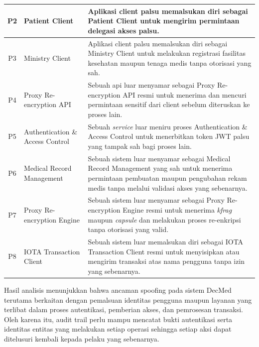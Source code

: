 \begin{xltabular}{\textwidth}{|c|>{\raggedright\arraybackslash}p{3.2cm}|X|}
    P2 &
    Patient Client &
    Aplikasi client palsu memalsukan diri sebagai Patient Client untuk mengirim permintaan delegasi akses palsu. \\
    \hline

    P3 &
    Ministry Client &
    Aplikasi client palsu memalsukan diri sebagai Ministry Client untuk melakukan registrasi fasilitas kesehatan maupun tenaga medis tanpa otorisasi yang sah. \\
    \hline

    P4 &
    Proxy Re-encryption API &
    Sebuah api luar menyamar sebagai Proxy Re-encryption API resmi untuk menerima dan mencuri permintaan sensitif dari client sebelum diteruskan ke proses lain. \\
    \hline

    P5 &
    Authentication \& Access Control &
    Sebuah \textit{service} luar meniru proses Authentication \& Access Control untuk menerbitkan token JWT palsu yang tampak sah bagi proses lain. \\
    \hline

    P6 &
    Medical Record Management &
    Sebuah sistem luar menyamar sebagai Medical Record Management yang sah untuk menerima permintaan pembuatan maupun pengubahan rekam medis tanpa melalui validasi akses yang sebenarnya. \\
    \hline

    P7 &
    Proxy Re-encryption Engine &
    Sebuah sistem luar menyamar sebagai Proxy Re-encryption Engine resmi untuk menerima \textit{kfrag} maupun \textit{capsule} dan melakukan proses re-enkripsi tanpa otorisasi yang valid. \\
    \hline

    P8 &
    IOTA Transaction Client &
    Sebuah sistem luar memalsukan diri sebagai IOTA Transaction Client resmi untuk menyisipkan atau mengirim transaksi atas nama pengguna tanpa izin yang sebenarnya. \\
    \hline

\end{xltabular}

Hasil analisis menunjukkan bahwa ancaman spoofing pada sistem DecMed terutama berkaitan dengan pemalsuan identitas pengguna maupun layanan yang terlibat dalam proses autentikasi, pemberian akses, dan pemrosesan transaksi. Oleh karena itu, audit trail perlu mampu mencatat bukti autentikasi serta identitas entitas yang melakukan setiap operasi sehingga setiap aksi dapat ditelusuri kembali kepada pelaku yang sebenarnya.



